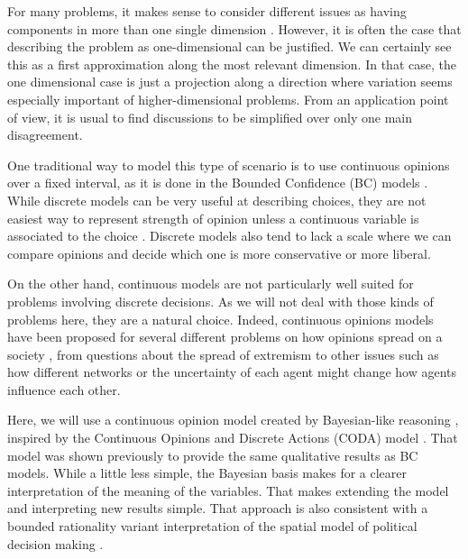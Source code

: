 \documentclass{article}
\begin{document}
For many problems, it makes sense to consider different issues as having
components in more than one single dimension \cite{vicenteetal08b}. However, it
is often the case that describing the problem as one-dimensional can be
justified. We can certainly see this as a first approximation along the most
relevant dimension. In that case, the one dimensional case is just a projection
along a direction where variation seems especially important of
higher-dimensional problems. From an application point of view, it is usual to
find discussions to be simplified over only one main disagreement.

One traditional way to model this type of scenario is to use continuous opinions
over a fixed interval, as it is done in the Bounded Confidence (BC) models
\cite{deffuantetal00,hegselmannkrause02}. While discrete models
\cite{galametal82,galammoscovici91,sznajd00} can be very useful at describing
choices, they are not easiest way to represent strength of opinion unless a
continuous variable is associated to the choice \cite{martins08a}. Discrete
models also tend to lack a scale where we can compare opinions and decide which
one is more conservative or more liberal.

On the other hand, continuous models are not particularly well suited for
problems involving discrete decisions. As we will not deal with those kinds of
problems here, they are a natural choice. Indeed, continuous opinions models
have been proposed for several different problems on how opinions spread on a
society \cite{deffuantetal02a,weisbuchetal05}, from questions about the spread
of extremism
\cite{amblarddeffuant04,gargiulomazzoni08a,alizadeh14a,Albi2016, franksetal08}
to other issues such as how different networks
\cite{Kurmyshev2011,Acemoglu2011,Das2014,Hu2017} or the uncertainty of each
agent \cite{deffuant06} might change how agents influence each other.

Here, we will use a continuous opinion model created by Bayesian-like reasoning
\cite{martins08c}, inspired by the Continuous Opinions and Discrete Actions
(CODA) model \cite{martins08a,martins12b}. That model was shown previously
\cite{martins08c} to provide the same qualitative results as BC models. While a
little less simple, the Bayesian basis makes for a clearer interpretation of the
meaning of the variables. That makes extending the model and interpreting new
results simple. That approach is also consistent with a bounded rationality
variant interpretation of the spatial model of political decision making
\cite{humphreys2010spatial,ostrom1998behavioral}.
\end{document}
